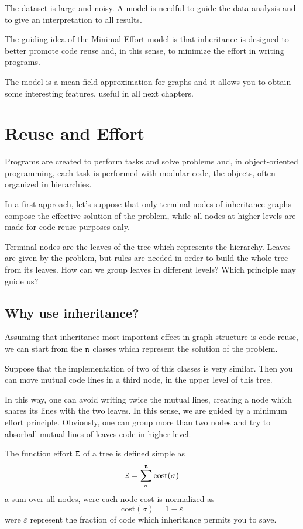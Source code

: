 The dataset is large and noisy. A model is needful to guide the data analysis and to give an interpretation to all results.

The guiding idea of the Minimal Effort model is that inheritance is designed to better promote code reuse and, in this sense, to minimize the effort in writing programs.

The model is a mean field approximation for graphs and it allows you to obtain some interesting features, useful in all next chapters. 

\section{Reuse and Effort}
Programs are created to perform tasks and solve problems and, in object-oriented programming, each task is performed with modular code, the objects, often organized in hierarchies.

In a first approach, let's suppose that only terminal nodes of inheritance graphs compose the effective solution of the problem, while all nodes at higher levels are made for code reuse purposes only.

Terminal nodes are the leaves of the tree which represents the hierarchy. Leaves are given by the problem, but rules are needed in order to build the whole tree from its leaves. How can we group leaves in different levels? Which principle may guide us?

\subsection{Why use inheritance?}
Assuming that inheritance most important effect in graph structure is code reuse, we can start from the $\mathfrak n$ classes which represent the solution of the problem.

Suppose that the implementation of two of this classes is very similar. Then you can move mutual code lines in a third node, in the upper level of this tree.

In this way, one can avoid writing twice the mutual lines, creating a node which shares its lines with the two leaves. In this sense, we are guided by a minimum effort principle. Obviously, one can group more than two nodes and try to absorball mutual lines of leaves code in higher level.

The function effort $\mathtt E$ of a tree is defined simple as
\[ \mathtt E = \sum_{\sigma}^{\mathfrak n} \text{cost}(\sigma) \]
a sum over all nodes, were each node cost is normalized as
\[ \text{cost}(\sigma) = 1 - \varepsilon \]
were $\varepsilon$ represent the fraction of code which inheritance permits you to save.

